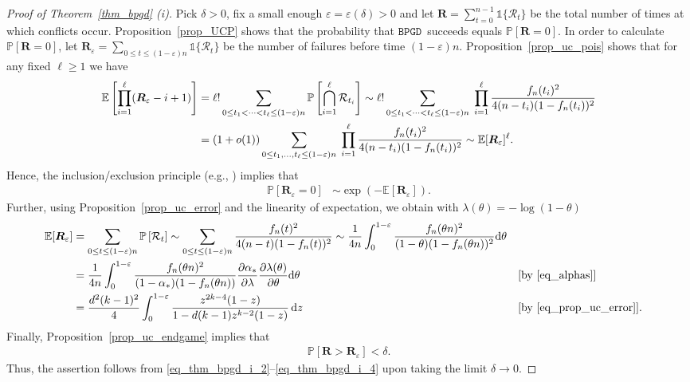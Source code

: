 \documentclass[10pt,reqno]{amsart}
\numberwithin{equation}{section}
\renewcommand{\vec}[1]{\boldsymbol{#1}}
\newcommand{\BPGD}{\ensuremath{\mathtt{BPGD}}}
\newcommand\cR{\mathcal R}
\newcommand\vR{\vec R}
\newcommand\eps{\varepsilon}
\newcommand\Erw{\mathbb{E}}
\newcommand\ex{\Erw}
\newcommand{\vecone}{\mathbb{1}}
\newcommand\brk[1]{\left\lbrack{#1}\right\rbrack}
\newcommand\pr{\mathbb{P}}
\newcommand\Prop{Proposition}
\newcommand\Thm{Theorem}
\def\pr{{\mathbb P}}
\begin{document}
\begin{proof}[Proof of \Thm~\ref{thm_bpgd} (i)]
	Pick $\delta>0$, fix a small enough $\eps=\eps(\delta)>0$ and let $\vR=\sum_{t=0}^{n-1}\vecone\{\cR_t\}$ be the total number of times at which conflicts occur.
	\Prop~\ref{prop_UCP} shows that the probability that \BPGD\ succeeds equals $\pr\brk{\vR=0}$.
	In order to calculate $\pr\brk{\vR=0}$, let $\vR_\eps=\sum_{0\leq t\leq(1-\eps)n}\vecone\{\cR_t\}$ be the number of failures before time $(1-\eps)n$.
	\Prop~\ref{prop_uc_pois} shows that for any fixed $\ell\geq1$ we have
	\begin{align}\nonumber
		\ex\brk{\prod_{i=1}^\ell(\vR_\eps-i+1)}&=\ell!\sum_{0\leq t_1<\cdots<t_\ell\leq (1-\eps)n}\pr\brk{\bigcap_{i=1}^\ell\cR_{t_i}}\sim\ell!\sum_{0\leq t_1<\cdots<t_\ell\leq (1-\eps)n} \hspace{1mm}
		\prod_{i=1}^\ell \frac{f_n(t_i)^2}{4(n-t_i)(1-f_n(t_i))^2}\\
										  &=(1+o(1))\sum_{0\leq t_1,\ldots,t_\ell\leq (1-\eps)n}
										  \hspace{1mm}\prod_{i=1}^\ell \frac{f_n(t_i)^2}{4(n-t_i)(1-f_n(t_i))^2}\sim\ex[\vR_\eps]^\ell.\label{eq_thm_bpgd_i_1}
	\end{align}
	Hence, the inclusion/exclusion principle (e.g., \cite[\Thm~1.21]{BB}) implies that 
	\begin{align}\label{eq_thm_bpgd_i_2}
		\pr\brk{\vR_\eps=0}&\sim\exp(-\ex[\vR_\eps]).
	\end{align}
	Further, using \Prop~\ref{prop_uc_error} and the linearity of expectation, we obtain with $\lambda(\theta) = -\log(1-\theta)$
\begin{align}\nonumber
	\ex[\vR_\eps]&=\sum_{0\leq t\leq(1-\eps)n }\pr\brk{\cR_t }\sim\sum_{0\leq t\leq(1-\eps)n}\frac{f_n(t)^2}{4(n-t)(1-f_n(t))^2}\sim\frac{1}{4n} \int_0^{1-\eps} \frac{f_n(\theta n)^2}{ (1-\theta)(1-f_n(\theta n))^2}  \mathrm d \theta \\
				 &= \frac{1}{4n} \int_0^{1-\eps} \frac{f_n(\theta n)^2}{  (1-\alpha_*)(1-f_n(\theta n)) } \frac{\partial \alpha_*}{\partial \lambda}\frac{\partial\lambda(\theta)}{\partial \theta} \mathrm d \theta   &&\mbox{[by \eqref{eq_alphas}]}\nonumber\\
				 &= \frac{d^2(k-1)^2}4\int_0^{1-\eps}\frac{z^{2k-4}(1-z)}{1-d(k-1)z^{k-2}(1-z)}\,\mathrm d z&&\mbox{[by \eqref{eq_prop_uc_error}]}.\label{eq_thm_bpgd_i_3}
\end{align}
Finally, \Prop~\ref{prop_uc_endgame} implies that
\begin{align}\label{eq_thm_bpgd_i_4}
	\pr\brk{\vR>\vR_\eps}<\delta.
\end{align}
Thus, the assertion follows from \eqref{eq_thm_bpgd_i_2}--\eqref{eq_thm_bpgd_i_4} upon taking the limit $\delta\to0$.
\end{proof}
\end{document}
